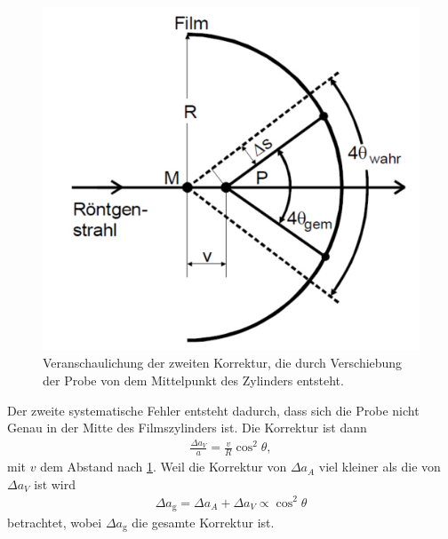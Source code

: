 \begin{figure}[h!]
	\centering
	\includegraphics[scale=0.4]{../Grafiken/ZweiteKorrektur.pdf}
	\caption{Veranschaulichung der zweiten Korrektur, die durch Verschiebung der Probe von dem Mittelpunkt des Zylinders entsteht.\cite{V41}}\label{fig:ZweiteKorrektur}
\end{figure}
Der zweite systematische Fehler entsteht dadurch, dass sich die Probe nicht Genau in der Mitte des Filmszylinders ist. Die Korrektur ist dann
\begin{align}
	\frac{\Delta a_V}{a}=\frac{v}{R}\cos^2\theta,
\end{align}
mit $v$ dem Abstand nach \cref{fig:ZweiteKorrektur}. Weil die Korrektur von $\Delta a_A$ viel kleiner als die von $\Delta a_V$ ist wird 
\begin{align}
	\Delta a_\text{g}=\Delta a_A+ \Delta a_V \propto \cos^2\theta
\end{align}
betrachtet, wobei $\Delta a_\text{g}$ die gesamte Korrektur ist.